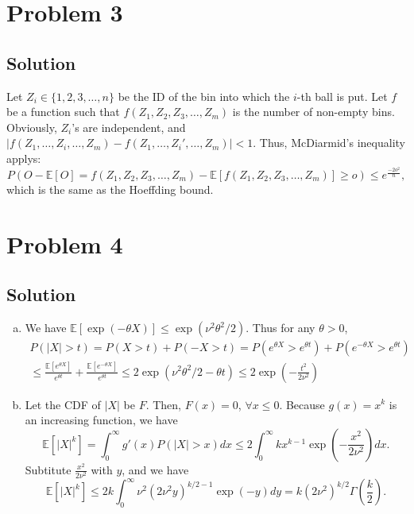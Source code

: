 \documentclass[11pt]{report}
\newcommand{\E}[1]{\mathbb{E}\left[#1\right]}
\begin{document}
\section*{Problem 3}
\subsection*{Solution}
Let $Z_i \in \{1,2,3, \dots, n\}$ be the ID of the bin into which the $i$-th ball is put. Let $f$ be a function such that $f(Z_1, Z_2, Z_3, \dots, Z_m)$ is the number of non-empty bins. Obviously, $Z_i$'s are independent, and $\left|f(Z_1, \dots, Z_i, \dots, Z_m) - f(Z_1, \dots, Z_i', \dots, Z_m)\right| < 1$. Thus, McDiarmid's inequality applys:
\[
  P(O-\E{O} = f(Z_1, Z_2, Z_3, \dots, Z_m) - \E{f(Z_1, Z_2, Z_3, \dots, Z_m)} \geq o) \leq e^\frac{-2 o^2}{n},
\]
which is the same as the Hoeffding bound.
\section*{Problem 4}
\subsection*{Solution}
\begin{enumerate}[(a)]
  \item
  We have $\E{\exp(-\theta X)} \leq \exp(\nu^2\theta^2/2)$. Thus for any $\theta > 0$,
  \begin{multline*}
    P(|X| > t) = P(X > t) + P(-X > t) = P(e^{\theta X} > e^{\theta t}) + P(e^{-\theta X} > e^{\theta t}) \\\leq \frac{\E{e^{\theta X}}}{e^{\theta t}} + \frac{\E{e^{-\theta X}}}{e^{\theta t}} \leq 2 \exp(\nu^2\theta^2/2  - \theta t) \leq 2 \exp(-\frac{t^2}{2 \nu^2})
  \end{multline*}
  \item Let the CDF of $|X|$ be $F$. Then, $F(x) = 0$, $\forall x \leq 0$. Because $g(x) = x^k$ is an increasing function, we have $$\E{|X|^k} = \int_{0}^{\infty} g'(x) P(|X|>x) dx \leq 2 \int_{0}^{\infty} kx^{k-1} \exp(-\frac{x^2}{2 \nu^2}) dx.$$ Subtitute $\frac{x^2}{2 \nu^2}$ with $y$, and we have $$\E{|X|^k} \leq 2 k \int_{0}^{\infty} \nu^2 (2 \nu^2 y)^{k/2-1} \exp(-y) dy = k (2\nu^2)^{k/2} \Gamma(\frac{k}{2}).$$
\end{enumerate}
\end{document}
